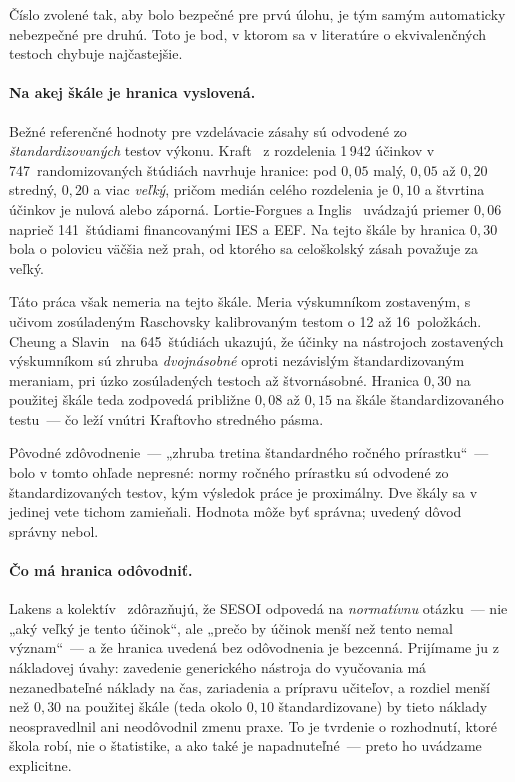 Číslo zvolené tak, aby bolo bezpečné pre prvú úlohu, je tým samým automaticky nebezpečné pre druhú. Toto je bod, v ktorom sa v literatúre o ekvivalenčných testoch chybuje najčastejšie.

\paragraph{Na akej škále je hranica vyslovená.} Bežné referenčné hodnoty pre vzdelávacie zásahy sú odvodené zo \emph{štandardizovaných} testov výkonu. Kraft~\cite{kraft2020effectsizes} z rozdelenia 1\,942 účinkov v 747~randomizovaných štúdiách navrhuje hranice: pod $0{,}05$ malý, $0{,}05$ až $0{,}20$ stredný, $0{,}20$ a viac \emph{veľký}, pričom medián celého rozdelenia je $0{,}10$ a štvrtina účinkov je nulová alebo záporná. Lortie-Forgues a Inglis~\cite{lortieforgues2019rarely} uvádzajú priemer $0{,}06$ naprieč 141~štúdiami financovanými IES a EEF. Na tejto škále by hranica $0{,}30$ bola o polovicu väčšia než prah, od ktorého sa celoškolský zásah považuje za veľký.

Táto práca však nemeria na tejto škále. Meria výskumníkom zostaveným, s učivom zosúladeným Raschovsky kalibrovaným testom o 12 až 16~položkách. Cheung a Slavin~\cite{cheung2016methodological} na 645~štúdiách ukazujú, že účinky na nástrojoch zostavených výskumníkom sú zhruba \emph{dvojnásobné} oproti nezávislým štandardizovaným meraniam, pri úzko zosúladených testoch až štvornásobné. Hranica $0{,}30$ na použitej škále teda zodpovedá približne $0{,}08$ až $0{,}15$ na škále štandardizovaného testu~--- čo leží vnútri Kraftovho stredného pásma.

Pôvodné zdôvodnenie~--- „zhruba tretina štandardného ročného prírastku“~--- bolo v tomto ohľade nepresné: normy ročného prírastku sú odvodené zo štandardizovaných testov, kým výsledok práce je proximálny. Dve škály sa v jedinej vete tichom zamieňali. Hodnota môže byť správna; uvedený dôvod správny nebol.

\paragraph{Čo má hranica odôvodniť.} Lakens a kolektív~\cite{lakens2018tosttutorial} zdôrazňujú, že SESOI odpovedá na \emph{normatívnu} otázku~--- nie „aký veľký je tento účinok“, ale „prečo by účinok menší než tento nemal význam“~--- a že hranica uvedená bez odôvodnenia je bezcenná. Prijímame ju z nákladovej úvahy: zavedenie generického nástroja do vyučovania má nezanedbateľné náklady na čas, zariadenia a prípravu učiteľov, a rozdiel menší než $0{,}30$ na použitej škále (teda okolo $0{,}10$ štandardizovane) by tieto náklady neospravedlnil ani neodôvodnil zmenu praxe. To je tvrdenie o rozhodnutí, ktoré škola robí, nie o štatistike, a ako také je napadnuteľné~--- preto ho uvádzame explicitne.

